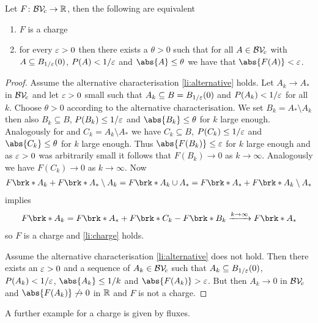 \begin{lemma}\label{le:alternativeCharge}
Let $F\colon\mathcal{BV\!}_c\to\mathbb{R}$, then the following are equivalent
\begin{enumerate}[label=(\roman*)]
	\item
	$F$ is a charge \label{li:charge}
	\item
	for every $\varepsilon>0$ then there exists a $\theta>0$ such that for all $A\in\mathcal{BV\!}_c$ with $A\subseteq B_{1/\varepsilon}(0)$, $P(A)<1/\varepsilon$ and $\abs{A}\leq\theta$ we have that $\abs{F(A)}<\e$. \label{li:alternative}
\end{enumerate}
\end{lemma}
\begin{proof}
Assume the alternative characterisation \ref{li:alternative} holds. Let $A_k\to A_*$ in $\mathcal{BV\!}_c$ and let $\varepsilon>0$ small such that $A_k\subseteq B=B_{1/\varepsilon}(0)$ and $P(A_k)<1/\varepsilon$ for all $k$. Choose $\theta>0$ according to the alternative characterisation. We set $B_k=A_*\setminus A_k$ then also $B_k\subseteq B$, $P(B_k)\leq 1/\varepsilon$ and $\abs{B_k}\leq\theta$ for $k$ large enough. Analogously for and $C_k=A_k\setminus A_*$ we have 
$C_k\subseteq B$, $P(C_k)\leq 1/\varepsilon$ and $\abs{C_k}\leq\theta$ for $k$ large enough.
Thus $\abs{F(B_k)}\leq\e$ for $k$ large enough and as $\varepsilon>0$ was arbitrarily small it follows that $F(B_k)\to0$ as $k\to\infty$. Analogously we have $F(C_k)\to0$ as $k\to\infty$. 
Now
\begin{align*}
	F\brk*{A_k}+F\brk*{A_*\setminus A_k} = F\brk*{A_k\cup A_*} = F\brk*{A_*}+F\brk*{A_k\setminus A_*}
\end{align*}
implies
\begin{align*}
	F\brk*{A_k} = F\brk*{A_*}+F\brk*{C_k}-F\brk*{B_k}\xrightarrow{k\to\infty}F\brk*{A_*}
\end{align*}
so $F$ is a charge and \ref{li:charge} holds.

Assume the alternative characterisation \ref{li:alternative} does not hold. Then there exists an $\varepsilon>0$ and a sequence of $A_k\in\mathcal{BV\!}_c$ such that $A_k\subseteq B_{1/\varepsilon}(0)$, $P(A_k)<1/\varepsilon$, $\abs{A_k}\leq 1/k$ and $\abs{F(A_k)}>\e$. But then $A_k\to0$ in $\mathcal{BV\!}_c$ and $\abs{F(A_k)}\not\to0$ in $\mathbb{R}$ and $F$ is not a charge.
\end{proof}

A further example for a charge is given by fluxes.

